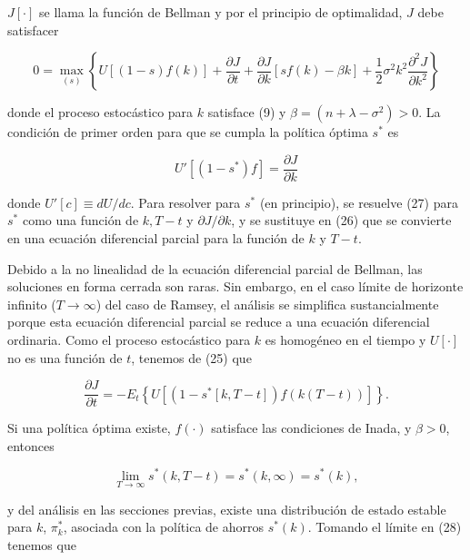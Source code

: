 \documentclass[a4paper,12pt]{article}
\begin{document}
\( J[\cdot] \) se llama la función de Bellman y por el principio de optimalidad, \( J \) debe satisfacer

		\begin{equation}
0 = \max_{(s)} \left\{ U[(1 - s)f(k)] + \frac{\partial J}{\partial t} + \frac{\partial J}{\partial k} [s f(k) - \beta k] + \frac{1}{2} \sigma^2 k^2 \frac{\partial^2 J}{\partial k^2} \right\}
		\end{equation}

donde el proceso estocástico para \( k \) satisface (9) y \( \beta = (n + \lambda - \sigma^2) > 0 \). La condición de primer orden para que se cumpla la política óptima \( s^* \) es

		\begin{equation}
U'[(1 - s^*)f] = \frac{\partial J}{\partial k}
		\end{equation}

donde \( U'[c] \equiv dU/dc \). Para resolver para \( s^* \) (en principio), se resuelve (27) para \( s^* \) como una función de \( k, T - t \) y \( \partial J/\partial k \), y se sustituye en (26) que se convierte en una ecuación diferencial parcial para la función de \( k \) y \( T - t \).

Debido a la no linealidad de la ecuación diferencial parcial de Bellman, las soluciones en forma cerrada son raras. Sin embargo, en el caso límite de horizonte infinito (\( T \to \infty \)) del caso de Ramsey, el análisis se simplifica sustancialmente porque esta ecuación diferencial parcial se reduce a una ecuación diferencial ordinaria. Como el proceso estocástico para \( k \) es homogéneo en el tiempo y \( U[\cdot] \) no es una función de \( t \), tenemos de (25) que

		\begin{equation}
\frac{\partial J}{\partial t} = -E_t \left\{ U[(1 - s^*[k, T - t]) f(k(T - t))] \right\}.
		\end{equation}

Si una política óptima existe, \( f(\cdot) \) satisface las condiciones de Inada, y \( \beta > 0 \), entonces

		\begin{equation}
\lim_{T \to \infty} s^*(k, T - t) = s^*(k, \infty) = s^*(k),
		\end{equation}

y del análisis en las secciones previas, existe una distribución de estado estable para \( k \), \( \pi_k^* \), asociada con la política de ahorros \( s^*(k) \). Tomando el límite en (28) tenemos que
\end{document}
